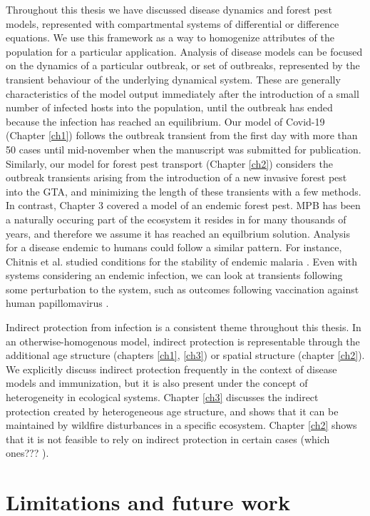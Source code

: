 Throughout this thesis we have discussed disease dynamics and forest pest models, represented with compartmental systems of differential or difference equations. We use this framework as a way to homogenize attributes of the population for a particular application. Analysis of disease models can be focused on the dynamics of a particular outbreak, or set of outbreaks, represented by the transient behaviour of the underlying dynamical system. These are generally characteristics of the model output immediately after the introduction of a small number of infected hosts into the population, until the outbreak has ended because the infection has reached an equilibrium. Our model of Covid-19 (Chapter \ref{ch1}) follows the outbreak transient from the first day with more than 50 cases until mid-november when the manuscript was submitted for publication. Similarly, our model for forest pest transport (Chapter \ref{ch2}) considers the outbreak transients arising from the introduction of a new invasive forest pest into the GTA, and minimizing the length of these transients with a few methods. In contrast, Chapter 3 covered a model of an endemic forest pest. MPB has been a naturally occuring part of the ecosystem it resides in for many thousands of years, and therefore we assume it has reached an equilbrium solution. Analysis for a disease endemic to humans could follow a similar pattern. For instance, Chitnis et al. studied conditions for the stability of endemic malaria \cite{chitnis2006bifurcation}. Even with systems considering an endemic infection, we can look at transients following some perturbation to the system, such as outcomes following vaccination against human papillomavirus \cite{lee2012mathematical}. 

Indirect protection from infection is a consistent theme throughout this thesis. In an otherwise-homogenous model, indirect protection is representable through the additional age structure (chapters \ref{ch1}, \ref{ch3}) or spatial structure (chapter \ref{ch2}). We explicitly discuss indirect protection frequently in the context of disease models and immunization, but it is also present under the concept of heterogeneity in ecological systems. Chapter \ref{ch3} discusses the indirect protection created by heterogeneous age structure, and shows that it can be maintained by  wildfire disturbances in a specific ecosystem. Chapter \ref{ch2} shows that it is not feasible to rely on indirect protection in certain cases (which ones??? ).   


\section{Limitations and future work}

